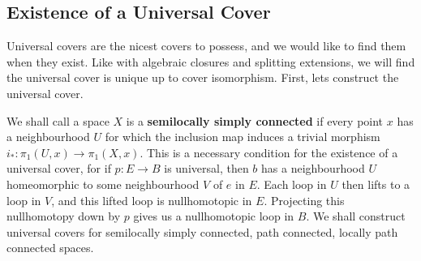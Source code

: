 \subsection{Existence of a Universal Cover}

Universal covers are the nicest covers to possess, and we would like to find them when they exist. Like with algebraic closures and splitting extensions, we will find the universal cover is unique up to cover isomorphism. First, lets construct the universal cover.

We shall call a space $X$ is a {\bf semilocally simply connected} if every point $x$ has a neighbourhood $U$ for which the inclusion map induces a trivial morphism $i_*: \pi_1(U,x) \to \pi_1(X,x)$. This is a necessary condition for the existence of a universal cover, for if $p: E \to B$ is universal, then $b$ has a neighbourhood $U$ homeomorphic to some neighbourhood $V$ of $e$ in $E$. Each loop in $U$ then lifts to a loop in $V$, and this lifted loop is nullhomotopic in $E$. Projecting this nullhomotopy down by $p$ gives us a nullhomotopic loop in $B$. We shall construct universal covers for semilocally simply connected, path connected, locally path connected spaces.

